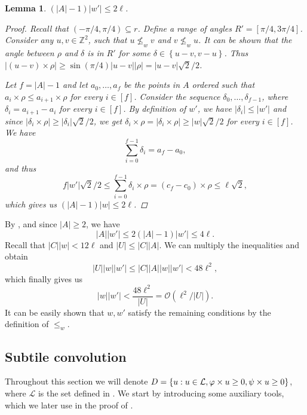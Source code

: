 \documentclass[11pt, letterpaper]{article}
\theoremstyle{plain}
\newtheorem{lemma}{Lemma}
\theoremstyle{definition}
\theoremstyle{remark}
\newcommand{\Z}{\mathbb{Z}}
\renewcommand{\O}{\mathcal{O}}
\renewcommand{\L}{\mathcal{L}}
\newcommand{\set}[1]{\left\lbrace #1 \right\rbrace}
\begin{document}
\begin{lemma}\label{A_ineq}
	$(|A| - 1) |w'| \le 2\ell$. 
	\begin{proof}
		Recall that $(-\pi / 4, \pi / 4) \subseteq r$.
		Define a range of angles $R' = [\pi / 4, 3\pi / 4]$.
		Consider any $u, v \in \Z^2$, such that $u \not \le_w v$ and $v \not \le_w u$.
		It can be shown that the angle between $\rho$ and $\delta$ is in $R'$ for some $\delta \in \set{u - v, v - u}$.
		Thus $|(u - v) \times \rho| \ge \sin(\pi / 4) |u - v||\rho| = |u - v|\sqrt{2} / 2$.
		
		Let $f = |A| - 1$ and let $a_0, \dots, a_{f}$ be the points in $A$ ordered such that $a_i \times \rho \le a_{i + 1} \times \rho$ for every $i \in [f]$.
		Consider the sequence $\delta_0, \dots, \delta_{f - 1}$, where $\delta_i = a_{i + 1} - a_i$ for every $i \in [f]$.
		By definition of $w'$, we have $|\delta_i| \le |w'|$ and since $|\delta_i \times \rho| \ge |\delta_i|\sqrt{2} / 2$, we get $\delta_i \times \rho = |\delta_i \times \rho| \ge |w| \sqrt{2} / 2$ for every $i \in [f]$.
		We have
		\[ \sum_{i = 0}^{f - 1} \delta_i = a_f - a_0,\]
		and thus
		\[ f|w'| \sqrt{2}/2 \le \sum_{i = 0}^{f - 1} \delta_i \times \rho = (c_f - c_0) \times \rho \le \ell \sqrt{2}, \]
		which gives us $(|A| - 1)|w| \le 2\ell$.
	\end{proof}
\end{lemma}

By , and since $|A| \ge 2$, we have
\[|A||w'| \le 2(|A| - 1) |w'| \le 4\ell.\]
Recall that $|C||w| < 12\ell$ and $|U| \le |C| |A|$. We can multiply the inequalities and obtain
\[ |U||w||w'| \le |C||A||w||w'| < 48 \ell^2,\]
which finally gives us
\[|w||w'| < \frac{48\ell^2}{|U|} = \O(\ell^2 / |U|). \]
It can be easily shown that $w, w'$ satisfy the remaining conditions by the definition of $\le_w$.


\newcommand{\W}{\mathcal{W}}
\subsection{Subtile convolution} \label{subtile_convolution_proof}

Throughout this section we will denote $D = \set{u : u \in \L, \h{u} \ge 0, \s{u} \ge 0}$, where $\L$ is the set defined in .
We start by introducing some auxiliary tools, which we later use in the proof of .
\end{document}

